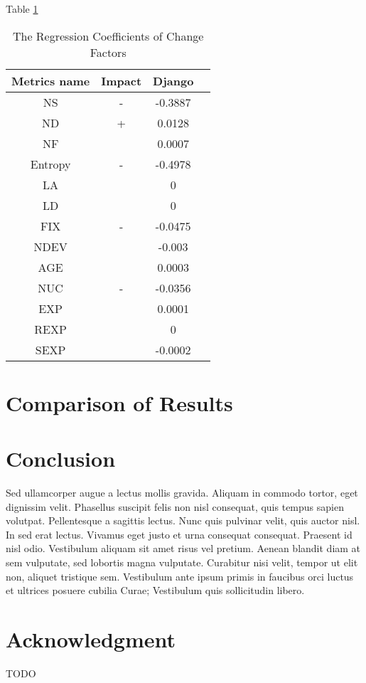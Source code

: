 \documentclass[10pt, conference]{IEEEtran}
\begin{document}
Table \ref{table:regression_coefficients}

\begin{table}
	\centering
	\caption{The Regression Coefficients of Change Factors}
	\begin{tabular}{|c|c|c|c|}
		\hline Metrics name & Impact & Django \\ 
		\hline NS & - & -0.3887 \\ 
		\hline ND & + & 0.0128 \\ 
		\hline NF &  & 0.0007 \\ 
		\hline Entropy & - & -0.4978 \\ 
		\hline LA &  & 0 \\ 
		\hline LD &  & 0 \\ 
		\hline FIX & - & -0.0475 \\ 
		\hline NDEV &  & -0.003 \\ 
		\hline AGE &  & 0.0003 \\ 
		\hline NUC & - & -0.0356 \\ 
		\hline EXP &  & 0.0001 \\ 
		\hline REXP &  & 0 \\ 
		\hline SEXP &  & -0.0002 \\ 
		\hline 
	\end{tabular}
	\label{table:regression_coefficients} 
\end{table}


\section{Comparison of Results}
\label{sec:comparison-results}

\section{Conclusion}
\label{sec:conclusion}

Sed ullamcorper augue a lectus mollis gravida. Aliquam in commodo tortor, eget dignissim velit. Phasellus suscipit felis non nisl consequat, quis tempus sapien volutpat. Pellentesque a sagittis lectus. Nunc quis pulvinar velit, quis auctor nisl. In sed erat lectus. Vivamus eget justo et urna consequat consequat. Praesent id nisl odio. Vestibulum aliquam sit amet risus vel pretium. Aenean blandit diam at sem vulputate, sed lobortis magna vulputate. Curabitur nisi velit, tempor ut elit non, aliquet tristique sem. Vestibulum ante ipsum primis in faucibus orci luctus et ultrices posuere cubilia Curae; Vestibulum quis sollicitudin libero.

\section*{Acknowledgment}
TODO

\balance


\end{document}
